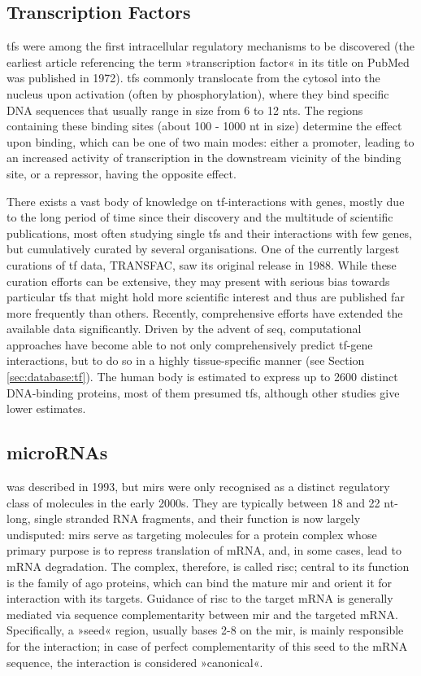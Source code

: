 \subsection{Transcription Factors} \label{sec:intro:tf}
\Acfp{tf} were among the first intracellular regulatory mechanisms to be discovered (the earliest article referencing the term »transcription factor« in its title on PubMed was published in 1972). \acp{tf} commonly translocate from the cytosol into the nucleus upon activation (often by phosphorylation), where they bind specific DNA sequences that usually range in size from 6 to 12 \acp{nt}. The regions containing these binding sites (about 100 - 1000 \ac{nt} in size) determine the effect upon binding, which can be one of two main modes: either a promoter, leading to an increased activity of transcription in the downstream vicinity of the binding site, or a repressor, having the opposite effect. 

There exists a vast body of knowledge on \ac{tf}-interactions with genes, mostly due to the long period of time since their discovery and the multitude of scientific publications, most often studying single \acp{tf} and their interactions with few genes, but cumulatively curated by several organisations. One of the currently largest curations of \ac{tf} data, TRANSFAC, saw its original release in 1988. While these curation efforts can be extensive, they may present with serious bias towards particular \acp{tf} that might hold more scientific interest and thus are published far more frequently than others. Recently, comprehensive efforts have extended the available data significantly. Driven by the advent of \ac{seq}, computational approaches have become able to not only comprehensively predict \ac{tf}-gene interactions, but to do so in a highly tissue-specific manner (see Section \ref{sec:database:tf}). The human body is estimated to express up to 2600 distinct DNA-binding proteins, most of them presumed \acp{tf}\cite{Babu2004}, although other studies give lower estimates. 

\subsection{microRNAs} \label{sec:intro:mirna}
 was described in 1993\cite{Lee1993}, but \acfp{mir} were only recognised as a distinct regulatory class of molecules in the early 2000s. They are typically between 18 and 22 \ac{nt}-long, single stranded RNA fragments, and their function is now largely undisputed: \acp{mir} serve as targeting molecules for a protein complex whose primary purpose is to repress translation of mRNA, and, in some cases, lead to mRNA degradation. The complex, therefore, is called \ac{risc}; central to its function is the family of \ac{ago} proteins, which can bind the mature \ac{mir} and orient it for interaction with its targets. Guidance of \ac{risc} to the target mRNA is generally mediated via sequence complementarity between \ac{mir} and the targeted mRNA. Specifically, a »seed« region, usually bases 2-8 on the \ac{mir}, is mainly responsible for the interaction; in case of perfect complementarity of this seed to the mRNA sequence, the interaction is considered »canonical«.

